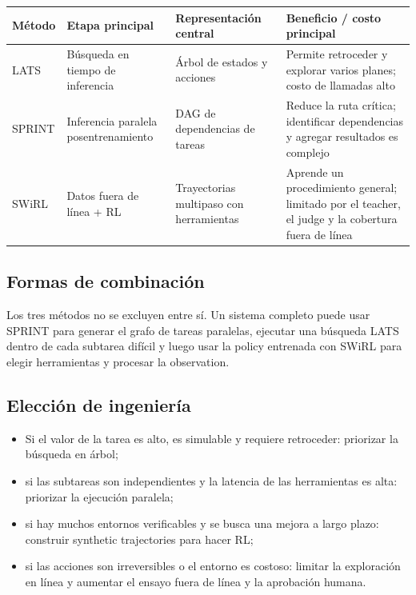 \documentclass[a4paper]{article}
\begin{document}
\begin{table}[H]
\centering
\small
\begin{tabular}{>{\raggedright\arraybackslash}p{2.2cm}>{\raggedright\arraybackslash}p{3.4cm}>{\raggedright\arraybackslash}p{3.4cm}>{\raggedright\arraybackslash}p{4.2cm}}
\toprule
\textbf{Método} & \textbf{Etapa principal} & \textbf{Representación central} & \textbf{Beneficio / costo principal} \\
\midrule
LATS & Búsqueda en tiempo de inferencia & Árbol de estados y acciones & Permite retroceder y explorar varios planes; costo de llamadas alto \\
SPRINT & Inferencia paralela posentrenamiento & DAG de dependencias de tareas & Reduce la ruta crítica; identificar dependencias y agregar resultados es complejo \\
SWiRL & Datos fuera de línea + RL & Trayectorias multipaso con herramientas & Aprende un procedimiento general; limitado por el teacher, el judge y la cobertura fuera de línea \\
\bottomrule
\end{tabular}
\end{table}

\subsection{Formas de combinación}

Los tres métodos no se excluyen entre sí. Un sistema completo puede usar SPRINT para generar el grafo de tareas paralelas, ejecutar una búsqueda LATS dentro de cada subtarea difícil y luego usar la policy entrenada con SWiRL para elegir herramientas y procesar la observation.

\subsection{Elección de ingeniería}

\begin{itemize}
    \item Si el valor de la tarea es alto, es simulable y requiere retroceder: priorizar la búsqueda en árbol;
    \item si las subtareas son independientes y la latencia de las herramientas es alta: priorizar la ejecución paralela;
    \item si hay muchos entornos verificables y se busca una mejora a largo plazo: construir synthetic trajectories para hacer RL;
    \item si las acciones son irreversibles o el entorno es costoso: limitar la exploración en línea y aumentar el ensayo fuera de línea y la aprobación humana.
\end{itemize}
\end{document}
